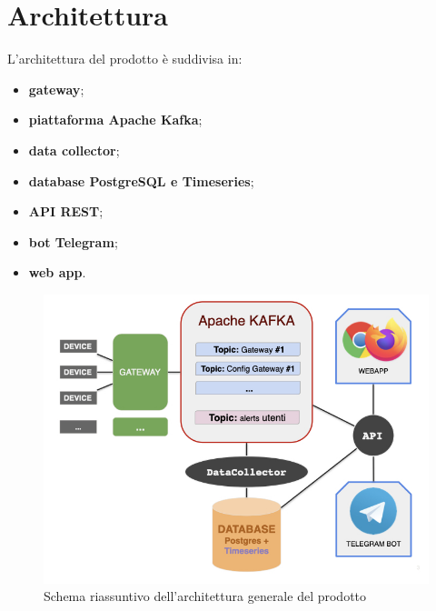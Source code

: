 \section{Architettura}

L'architettura del prodotto è suddivisa in:
	\begin{itemize}
	  	\item \textbf{gateway};
	  	\item \textbf{piattaforma Apache Kafka};
	  	\item \textbf{data collector};
	  	\item \textbf{database PostgreSQL e Timeseries};
	  	\item \textbf{API REST};
	  	\item \textbf{bot Telegram};
	  	\item \textbf{web app}.    
	\end{itemize} 

	\begin{figure}[H]
		\centering
		\includegraphics[scale=0.600]{res/images/architetturaGenerale.jpeg}
		\caption{Schema riassuntivo dell'architettura generale del prodotto}
	\end{figure}
	
